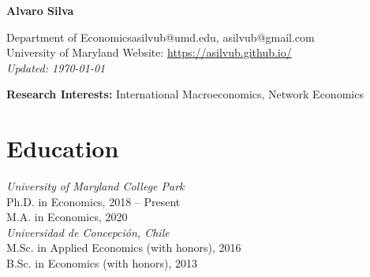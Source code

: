 \documentclass[11pt]{article}
\begin{document}
\begin{center}
\begin{Large} \bfseries Alvaro Silva\end{Large}
\end{center}


\vspace*{0.2in}
Department of Economics\hfill asilvub@umd.edu, asilvub@gmail.com \\
University of Maryland \hfill Website: \href{https://asilvub.github.io/}{https://asilvub.github.io/} \\
\hfill \emph{Updated: \today}\\

\vspace*{-0.1in}


\textbf{\normalsize Research Interests: } International Macroeconomics, Network Economics

\section*{Education}
{\itshape University of Maryland College Park}\\
Ph.D. in Economics, 2018 --  Present\\
M.A. in Economics, 2020 \\[-0.1in]

{\itshape Universidad de Concepci\'on, Chile}\\
M.Sc. in Applied Economics (with honors), 2016 \\
B.Sc. in Economics (with honors), 2013

\end{document}
